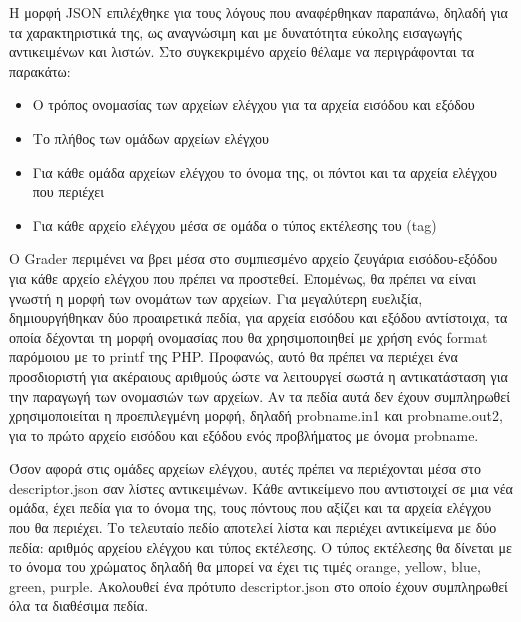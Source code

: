 \documentclass[diploma]{softlab-thesis}
\begin{document}
\bigskip

Η μορφή JSON επιλέχθηκε για τους λόγους που αναφέρθηκαν παραπάνω, δηλαδή για τα
χαρακτηριστικά της, ως αναγνώσιμη και με δυνατότητα εύκολης εισαγωγής αντικειμένων
και λιστών. Στο συγκεκριμένο αρχείο θέλαμε να περιγράφονται τα παρακάτω:

\begin{itemize}
    \item Ο τρόπος ονομασίας των αρχείων ελέγχου για τα αρχεία εισόδου και εξόδου

    \item Το πλήθος των ομάδων αρχείων ελέγχου

    \item Για κάθε ομάδα αρχείων ελέγχου το όνομα της, οι πόντοι
      και τα αρχεία ελέγχου που περιέχει

    \item Για κάθε αρχείο ελέγχου μέσα σε ομάδα ο τύπος εκτέλεσης του (tag)

\end{itemize}

Ο Grader περιμένει να βρει μέσα στο συμπιεσμένο αρχείο ζευγάρια εισόδου-εξόδου
για κάθε αρχείο ελέγχου που πρέπει να προστεθεί. Επομένως, θα πρέπει να είναι
γνωστή η μορφή των ονομάτων των αρχείων. Για μεγαλύτερη ευελιξία,
δημιουργήθηκαν δύο προαιρετικά πεδία, για αρχεία εισόδου και εξόδου αντίστοιχα,
τα οποία δέχονται τη μορφή ονομασίας που θα χρησιμοποιηθεί με χρήση ενός format
παρόμοιου με το printf της PHP. Προφανώς, αυτό θα πρέπει να περιέχει ένα
προσδιοριστή για ακέραιους αριθμούς ώστε να λειτουργεί σωστά η αντικατάσταση
για την παραγωγή των ονομασιών των αρχείων. Αν τα πεδία αυτά δεν έχουν
συμπληρωθεί χρησιμοποιείται η προεπιλεγμένη μορφή, δηλαδή probname.in1 και
probname.out2, για το πρώτο αρχείο εισόδου και εξόδου ενός προβλήματος με όνομα
probname.

\bigskip

Όσον αφορά στις ομάδες αρχείων ελέγχου, αυτές πρέπει να περιέχονται μέσα στο
descriptor.json σαν λίστες αντικειμένων. Κάθε αντικείμενο που αντιστοιχεί σε
μια νέα ομάδα, έχει πεδία για το όνομα της, τους πόντους που αξίζει και τα
αρχεία ελέγχου που θα περιέχει. Το τελευταίο πεδίο αποτελεί λίστα και περιέχει
αντικείμενα με δύο πεδία: αριθμός αρχείου ελέγχου και τύπος εκτέλεσης. Ο τύπος
εκτέλεσης θα δίνεται με το όνομα του χρώματος δηλαδή θα μπορεί να έχει τις
τιμές orange, yellow, blue, green, purple. Ακολουθεί ένα πρότυπο
descriptor.json στο οποίο έχουν συμπληρωθεί όλα τα διαθέσιμα πεδία.
\end{document}
